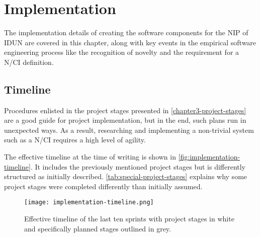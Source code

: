 \chapter{Implementation}
\graphicspath{{Chapter4/Figs/}{Chapter4/Figs/}}

The implementation details of creating the software components for the NIP of IDUN are covered in this chapter, along with key events in the empirical software engineering process like the recognition of novelty and the requirement for a N/CI definition.

\section{Timeline}
\label{chapter4-timeline}

Procedures enlisted in the project stages presented in \autoref{chapter3-project-stages} are a good guide for project implementation, but in the end, such plans run in unexpected ways. As a result, researching and implementing a non-trivial system such as a N/CI requires a high level of agility.

The effective timeline at the time of writing is shown in \autoref{fig:implementation-timeline}. It includes the previously mentioned project stages but is differently structured as initially described. \autoref{tab:special-project-stages} explains why some project stages were completed differently than initially assumed.

\begin{figure}[!ht]
  \centering
  \texttt{[image: implementation-timeline.png]}
  \caption{Effective timeline of the last ten sprints with project stages in white and specifically planned stages outlined in grey.}
  \label{fig:implementation-timeline}
\end{figure}

